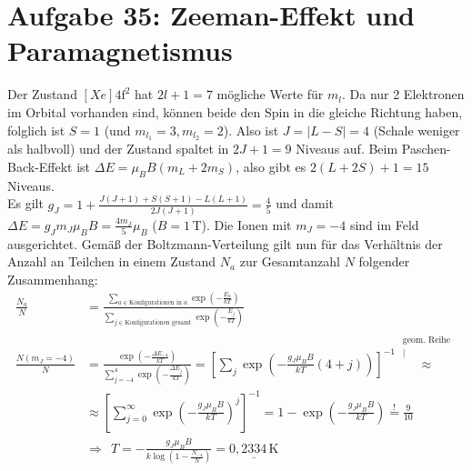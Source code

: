 \documentclass[a4paper,12pt]{article}
\newcommand{\kom}{}
\newcommand{\kla}{}
\newcommand{\klam}{}
\newcommand{\tecxt}{}
\begin{document}
\section*{Aufgabe 35: Zeeman-Effekt und Paramagnetismus}
Der Zustand $[Xe]4\tecxt\text{f}^2$ hat $2l+1=7$ mögliche Werte für $m_l$. Da nur 2 Elektronen im Orbital vorhanden sind, können beide den Spin in die gleiche Richtung haben, folglich ist $S=1$ (und $m_{l_1}=3,m_{l_2}=2$). Also ist $J=|L-S|=4$ (Schale weniger als halbvoll) und der Zustand spaltet in $2J+1=9$ Niveaus auf. Beim Paschen-Back-Effekt ist $\Delta E=\mu_BB(m_L+2m_S)$, also gibt es $2(L+2S)+1=15$ Niveaus.\\
Es gilt $g_J=1+\frac{J(J+1)+S(S+1)-L(L+1)}{2J(J+1)}=\frac{4}{5}$ und damit $\Delta E=g_Jm_J\mu_BB=\frac{4m_J}{5}\mu_B$ ($B=1\,$T). Die Ionen mit $m_J=-4$ sind im Feld ausgerichtet. Gemäß der Boltzmann-Verteilung gilt nun für das Verhältnis der Anzahl an Teilchen in einem Zustand $N_a$ zur Gesamtanzahl $N$ folgender Zusammenhang:
\begin{align*}
\frac{N_a}{N}&=\frac{\sum_{a\in\tecxt\text{Konfigurationen in }a}\exp\kla\left( {-\frac{E_a}{kT}} \right)}{\sum_{j\in\tecxt\text{Konfigurationen gesamt}}\exp\kla\left( {-\frac{E_j}{kT}} \right)}\\
\frac{N(m_J=-4)}{N}&=\frac{\exp\kla\left( -\frac{\Delta E_{-4}}{kT} \right)}{\sum_{j=-4}^4\exp\kla\left( {-\frac{\Delta E_j}{kT}} \right)}=\klam\left[ {\sum_j\exp\kla\left( {-\frac{g_J\mu_BB}{kT}\kla\left( {4+j} \right)} \right)} \right]^{-1}\kom\overset{\substack{{\tecxt\text{geom. Reihe}} \\ |}}{\approx}\\
&\approx \klam\left[ {\sum_{j=0}^\infty\exp\kla\left( {-\frac{g_J\mu_BB}{kT}} \right)^j} \right]^{-1}=1-\exp\kla\left( {-\frac{g_J\mu_BB}{kT}} \right)\overset{!}{=}\frac{9}{10}\\
&\Rightarrow\ \ T=-\frac{g_J\mu_BB}{k\log\kla\left( {1-\frac{N_{-4}}{N}} \right)}=\underline{0,2334\,\tecxt\text{K}}
\end{align*}
\end{document}
